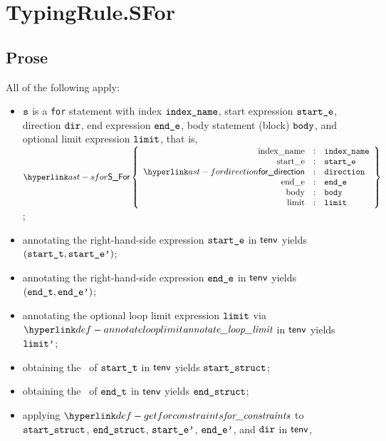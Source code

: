 
\section{TypingRule.SFor \label{sec:TypingRule.SFor}}
\subsection{Prose}
All of the following apply:
\begin{itemize}
  \item $\texttt{s}$ is a \texttt{for} statement with index $\texttt{index\_name}$,
        start expression $\texttt{start\_e}$,
        direction $\texttt{dir}$,
        end expression $\texttt{end\_e}$,
        body statement (block) $\texttt{body}$,
        and optional limit expression $\texttt{limit}$,
        that is, $\SFor\left\{\begin{array}{rcl}
          \Forindexname &:& \vindexname\\
          \Forstarte &:& \vstarte\\
          \fordirection &:& \vdirection\\
          \Forende &:& \vende\\
          \Forbody &:& \vbody\\
          \Forlimit &:& \vlimit
        \end{array}\right\}$;
  \item annotating the right-hand-side expression $\texttt{start\_e}$ in $\textsf{tenv}$ yields \\
        $(\texttt{start\_t}, \texttt{start\_e'})$\ProseOrTypeError;
  \item annotating the right-hand-side expression $\texttt{end\_e}$ in $\textsf{tenv}$ yields $(\texttt{end\_t}, \texttt{end\_e'})$\ProseOrTypeError;
  \item annotating the optional loop limit expression $\texttt{limit}$ via $\annotatelooplimit$ in $\textsf{tenv}$
        yields $\texttt{limit'}$\ProseOrTypeError;
  \item obtaining the \underlyingtype\ of $\texttt{start\_t}$ in $\textsf{tenv}$ yields $\texttt{start\_struct}$\ProseOrTypeError;
  \item obtaining the \underlyingtype\ of $\texttt{end\_t}$ in $\textsf{tenv}$ yields $\texttt{end\_struct}$\ProseOrTypeError;
  \item applying $\getforconstraints$ to $\texttt{start\_struct}$, $\texttt{end\_struct}$,
        $\texttt{start\_e'}$, $\texttt{end\_e'}$, and $\texttt{dir}$ in $\textsf{tenv}$,

\end{itemize}
